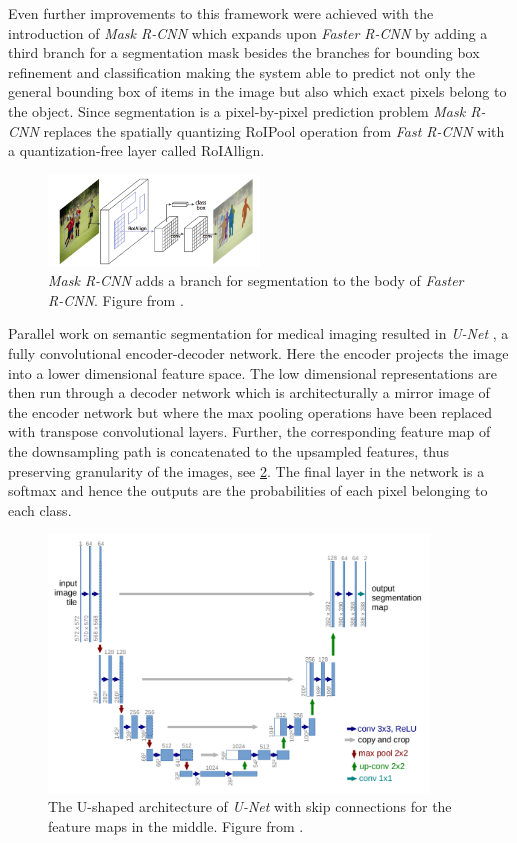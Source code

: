 \documentclass{kththesis}
\newcommand{\bibentry}[1]{\parencite{#1}}
\begin{document}
Even further improvements to this framework were achieved with the introduction of \emph{Mask R-CNN}
\bibentry{he2017mask} which expands upon \emph{Faster R-CNN} by adding a third
branch for a segmentation mask besides the branches for bounding box refinement
and classification making the system able to predict not only the general
bounding box of items in the image but also which exact pixels belong to the
object. Since segmentation is a pixel-by-pixel prediction problem \emph{Mask
  R-CNN} replaces the spatially quantizing RoIPool operation from \emph{Fast
  R-CNN} with a quantization-free layer called RoIAllign. 

\begin{figure}[h]
  \centering
  \includegraphics[width=0.5\textwidth]{MaskR-CNN}
  \caption{\textit{Mask R-CNN} adds a branch for segmentation to the body of
    \textit{Faster R-CNN}. Figure from \textcite[]{he2017mask}.}
  \label{fig:AlexNet}
  \end{figure}

Parallel work on semantic segmentation for medical imaging resulted in
\emph{U-Net} \parencite[]{UNet}, a fully convolutional encoder-decoder network.
Here the encoder projects the image into a lower dimensional feature space.
The low dimensional representations are then run through a decoder
network which is architecturally a mirror image of the encoder network but where
the max pooling operations have been replaced with transpose convolutional
layers. Further, the corresponding feature map of the downsampling path is
concatenated to the upsampled features, thus preserving
granularity of the images, see \cref{fig:UNet}. The final layer in the network is a softmax and hence
the outputs are the probabilities of each pixel belonging to each class.
\begin{figure}[h]
  \centering
  \includegraphics[width=0.9\textwidth]{U-Net}
  \caption{The U-shaped architecture of \textit{U-Net} with skip connections for
    the feature maps in the middle. Figure from \textcite[]{UNet}.}
  \label{fig:UNet}
  \end{figure}
\end{document}
